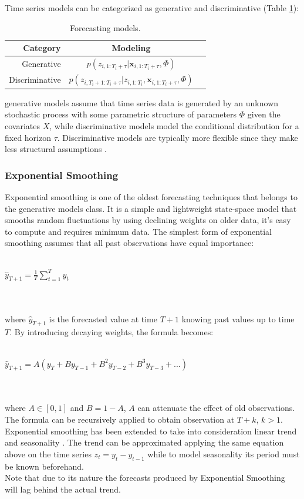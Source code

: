 \documentclass[a4paper, 12pt]{article} %
\newcommand{\ra}[1]{\renewcommand{\arraystretch}{#1}}
\begin{document}
	Time series models can be categorized as generative and discriminative \cite{DiscriminativeGenerativeModels} (Table \ref{table:generativediscriminative}):
	\begin{table}\centering 
		\ra{1.3}
		\begin{tabular}{@{}rcr@{}}\toprule
			Category & Modeling\\
			 \midrule
			 Generative & $p(z_{i,1:T_i+\tau} | \pmb{x}_{i, 1:T_i + \tau}, \Phi)$\\
			 Discriminative &  $p(z_{i,T_{i}+1:T_i+\tau} | z_{i, 1:T_i}, \pmb{x}_{i, 1:T_i + \tau}, \Phi)$\\
			\bottomrule
		\end{tabular}
		\caption{Forecasting models.} \label{table:generativediscriminative}
	\end{table}
	generative models assume that time series data is generated by an unknown stochastic process with some parametric structure of parameters $\Phi$ given the covariates $X$, while discriminative models model the conditional distribution for a fixed horizon $\tau$. Discriminative models are typically more flexible since they make less structural assumptions \cite{GluonTS}.
	
	
	\subsubsection{Exponential Smoothing} \label{sssec:exponential_smoothing}
	Exponential smoothing \cite{ExponentialSmoothingHoltCharles} is one of the oldest forecasting techniques that belongs to the generative models class. It is a simple and lightweight state-space model that smooths random fluctuations by using declining weights on older data, it's easy to compute and requires minimum data.
	The simplest form of exponential smoothing assumes that all past observations have equal importance:\\\\
	\centerline{$\hat{y}_{T+1} = \frac{1}{T} \sum_{t=1}^{T}y_t$}\\\\
	where $\hat{y}_{T+1}$ is the forecasted value at time $T+1$ knowing past values up to time $T$. By introducing decaying weights, the formula becomes:\\\\
		\centerline{$\hat{y}_{T+1} = A(y_T + B y_{T-1} + B^2 y_{T-2} + B^3 y_{T-3} + ...)$ }\\\\
	where $A \in [0,1]$ and $B=1-A$, $A$ can attenuate the effect of old observations. The formula can be recursively applied to obtain observation at $T+k$, $k>1$. \\
	Exponential smoothing has been extended to take into consideration linear trend and seasonality \cite{ExponentialSmoothingHoltCharles}. The trend can be approximated applying the same equation above on the time series $z_t = y_t - y_{t-1}$ while to model seasonality its period must be known beforehand.\\
	Note that due to its nature the forecasts produced by Exponential Smoothing will lag behind the actual trend.
	
\end{document}
